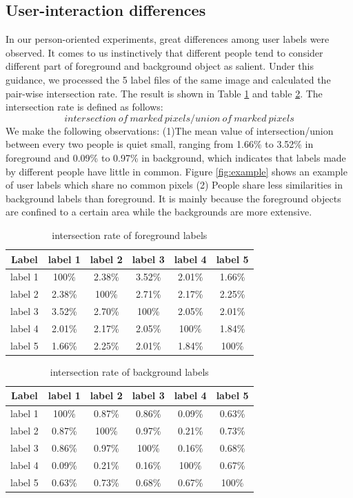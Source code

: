 \documentclass[runningheads,a4paper]{llncs}
\begin{document}
\subsection{User-interaction differences}
In our person-oriented experiments, great differences among user labels were observed. It comes to us instinctively that different people tend to consider different part of foreground and background object as salient. Under this guidance, we processed the 5 label files of the same image and calculated the pair-wise intersection rate. The result is shown in Table \ref{ta:intersection rate f} and table \ref{ta:intersection rate b}. The intersection rate is defined as follows:
$$intersection\ of\ marked\ pixels/union\ of\ marked\ pixels$$
We make the following observations: (1)The mean value of intersection/union between every two people is quiet small, ranging from 1.66\% to 3.52\% in foreground and 0.09\% to 0.97\% in background, which indicates that labels made by different people have little in common. Figure \ref{fig:example} shows an example of user labels which share no common pixels (2) People share less similarities in background labels than foreground. It is mainly because the foreground objects are confined to a certain area while the backgrounds are more extensive.

\begin{table}[!tb]
\centering
\caption{intersection rate of foreground labels}
\begin{tabular}{|c|c|c|c|c|c|}
\hline
 Label & label 1 & label 2 & label 3 & label 4& label 5 \\
\hline
label 1 & 100\% & 2.38\% & 3.52\% & 2.01\%& 1.66\% \\
\hline
label 2 & 2.38\% & 100\% & 2.71\% & 2.17\%& 2.25\% \\
\hline
label 3 & 3.52\% & 2.70\% & 100\% & 2.05\%& 2.01\%\\
\hline
label 4 & 2.01\% & 2.17\% & 2.05\% & 100\%& 1.84\% \\
\hline
label 5 & 1.66\% & 2.25\% & 2.01\% & 1.84\%& 100\% \\
\hline
\end{tabular}
\captionsetup{justification=centerlast}
\label{ta:intersection rate f}
\end{table}


\begin{table}[!tb]
\centering
\caption{intersection rate of background labels}
\begin{tabular}{|c|c|c|c|c|c|}
\hline
 Label & label 1 & label 2 & label 3 & label 4& label 5 \\
\hline
label 1 & 100\% & 0.87\% & 0.86\% & 0.09\%& 0.63\% \\
\hline
label 2 & 0.87\% & 100\% & 0.97\% & 0.21\%& 0.73\% \\
\hline
label 3 & 0.86\% & 0.97\% & 100\% & 0.16\%& 0.68\%\\
\hline
label 4 & 0.09\% & 0.21\% & 0.16\% & 100\%& 0.67\% \\
\hline
label 5 & 0.63\% & 0.73\% & 0.68\% & 0.67\% & 100\% \\
\hline
\end{tabular}
\captionsetup{justification=centerlast}
\label{ta:intersection rate b}
\end{table}
\end{document}

